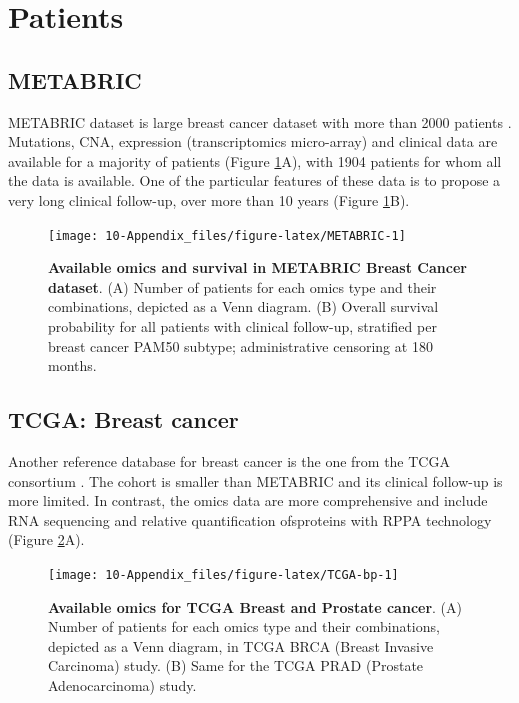 \documentclass[a4paper,12pt,twoside,onecolumn,openright,final,oldfontcommands]{memoir}
\begin{document}
\section{Patients}\label{appendix-datasets-patients}

\subsection{METABRIC}\label{metabric}

METABRIC dataset is large breast cancer dataset with more than 2000
patients \citep{pereira2016somatic}. Mutations, CNA, expression
(transcriptomics micro-array) and clinical data are available for a
majority of patients (Figure \ref{fig:METABRIC}A), with 1904 patients
for whom all the data is available. One of the particular features of
these data is to propose a very long clinical follow-up, over more than
10 years (Figure \ref{fig:METABRIC}B).

\begin{figure}

{\centering \texttt{[image: 10-Appendix\_files/figure-latex/METABRIC-1]} 

}

\caption[Available omics and survival in METABRIC Breast Cancer dataset]{\textbf{Available omics and survival in METABRIC
Breast Cancer dataset}. (A) Number of patients for each omics type and
their combinations, depicted as a Venn diagram. (B) Overall survival
probability for all patients with clinical follow-up, stratified per
breast cancer PAM50 subtype; administrative censoring at 180 months.}\label{fig:METABRIC}
\end{figure}







\subsection{TCGA: Breast cancer}\label{tcga-breast-cancer}

Another reference database for breast cancer is the one from the TCGA
consortium \citep{cancer2012comprehensive}. The cohort is smaller than
METABRIC and its clinical follow-up is more limited. In contrast, the
omics data are more comprehensive and include RNA sequencing and
relative quantification ofsproteins with RPPA technology (Figure
\ref{fig:TCGA-bp}A).

\begin{figure}

{\centering \texttt{[image: 10-Appendix\_files/figure-latex/TCGA-bp-1]} 

}

\caption[Available omics and survival in METABRIC Breast Cancer dataset]{\textbf{Available omics for TCGA Breast and
Prostate cancer}. (A) Number of patients for each omics type and their
combinations, depicted as a Venn diagram, in TCGA BRCA (Breast Invasive
Carcinoma) study. (B) Same for the TCGA PRAD (Prostate Adenocarcinoma)
study.}\label{fig:TCGA-bp}
\end{figure}
\end{document}
